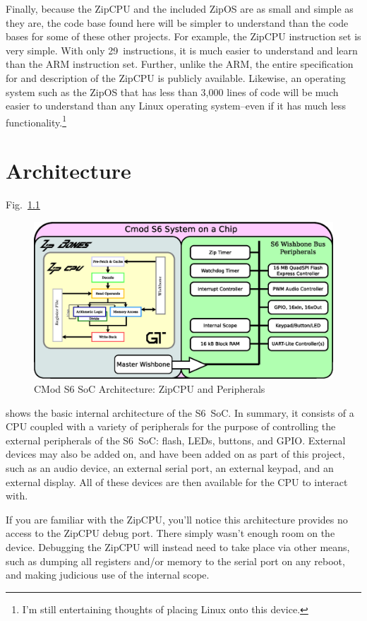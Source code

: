 \documentclass{gqtekspec}
\begin{document}
Finally, because the ZipCPU and the included ZipOS are as small and simple as
they are, the code base found here will be simpler to understand than the
code bases for some of these other projects.  For example, the ZipCPU
instruction set is very simple.  With only 29~instructions, it is much
easier to understand and learn than the ARM instruction set.  Further, unlike
the ARM, the entire specification for and description of the ZipCPU is
publicly available.  Likewise, an operating system such as the ZipOS that has
less than \hbox{3,000} lines of code will be much easier to understand than any
Linux operating system--even if it has much less functionality.\footnote{I'm
still entertaining thoughts of placing Linux onto this device.}

\chapter{Architecture}
Fig.~\ref{fig:architecture}
\begin{figure}\begin{center}
\includegraphics[width=5in]{../gfx/s6bones.eps}
\caption{CMod S6 SoC Architecture: ZipCPU and
	Peripherals}\label{fig:architecture}
\end{center}\end{figure}
shows the basic internal architecture of the S6~SoC.  In summary, it consists
of a CPU
coupled with a variety of peripherals for the purpose of controlling the
external peripherals of the S6~SoC: flash, LEDs, buttons, and GPIO.  External
devices may also be added on, and have been added on as part of this project,
such as an audio device, an external serial port, an external keypad, and an
external display.  All of these devices are then available for the CPU to
interact with.

If you are familiar with the ZipCPU, you'll notice this architecture provides
no access to the ZipCPU debug port.  There simply wasn't enough room on the
device.  Debugging the ZipCPU will instead need to take place via other means,
such as dumping all registers and/or memory to the serial port on any reboot,
and making judicious use of the internal scope.
\end{document}
